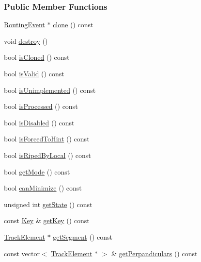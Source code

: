 \subsubsection*{Public Member Functions}
\begin{DoxyCompactItemize}
\item 
\hyperlink{classKite_1_1RoutingEvent}{Routing\+Event} $\ast$ \hyperlink{classKite_1_1RoutingEvent_ad4469c7fdb58a5f0bda8755302e37021}{clone} () const
\item 
void \hyperlink{classKite_1_1RoutingEvent_a3a80b6032f86a56bec74609034b3246f}{destroy} ()
\item 
bool \hyperlink{classKite_1_1RoutingEvent_a213956f734f660863e55f8f398cf932a}{is\+Cloned} () const
\item 
bool \hyperlink{classKite_1_1RoutingEvent_a5bc2a781be2586924afce4e4a4ea6697}{is\+Valid} () const
\item 
bool \hyperlink{classKite_1_1RoutingEvent_af8b3ab994396ccd821f529c5c02760a5}{is\+Unimplemented} () const
\item 
bool \hyperlink{classKite_1_1RoutingEvent_a83943e04f0ee0a5a38208278b97fc780}{is\+Processed} () const
\item 
bool \hyperlink{classKite_1_1RoutingEvent_a50607443b762961229119228be30c5ad}{is\+Disabled} () const
\item 
bool \hyperlink{classKite_1_1RoutingEvent_a6e38564fbae008179d865f844acba59a}{is\+Forced\+To\+Hint} () const
\item 
bool \hyperlink{classKite_1_1RoutingEvent_ac460ce43ff71dcdf11091403c4ba9060}{is\+Riped\+By\+Local} () const
\item 
bool \hyperlink{classKite_1_1RoutingEvent_a150a8fe8d214e9de76153c1d20676a98}{get\+Mode} () const
\item 
bool \hyperlink{classKite_1_1RoutingEvent_a85d665e52caee3e804921f52417b0074}{can\+Minimize} () const
\item 
unsigned int \hyperlink{classKite_1_1RoutingEvent_a40ec2b23684a0e6e6d7ac9783a269037}{get\+State} () const
\item 
const \hyperlink{classKite_1_1RoutingEvent_1_1Key}{Key} \& \hyperlink{classKite_1_1RoutingEvent_ade1e79e88bf4f4c173ffd083dd5470c9}{get\+Key} () const
\item 
\hyperlink{classKite_1_1TrackElement}{Track\+Element} $\ast$ \hyperlink{classKite_1_1RoutingEvent_a506a4d1cef59fc35984c1c88e0c0f6df}{get\+Segment} () const
\item 
const vector$<$ \hyperlink{classKite_1_1TrackElement}{Track\+Element} $\ast$ $>$ \& \hyperlink{classKite_1_1RoutingEvent_ab7d24e13f7b2c62cedce1fda2da7b7f5}{get\+Perpandiculars} () const

\end{DoxyCompactItemize}
